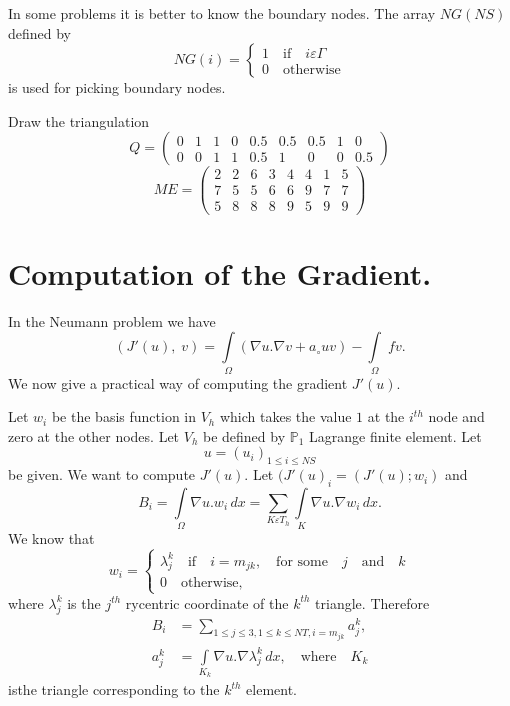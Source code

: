 In some problems it is better to know the boundary nodes. The array
$NG(NS)$ defined by 
\begin{equation*}
NG(i)=
\begin{cases}
1\quad\text{if}\quad i\varepsilon\Gamma\\
0\quad\text{otherwise}
\end{cases}
\end{equation*}
is used for picking boundary nodes.

\begin{exercise}\label{chap4:exr2}
Draw the triangulation
\begin{equation*}
Q=
\begin{pmatrix}
0&1&1&0&0.5&0.5&0.5&1&0\\
0&0&1&1&0.5&1&0&0&0.5
\end{pmatrix}
\end{equation*}
\begin{equation*}
ME=
\begin{pmatrix}
2&2&6&3&4&4&1&5\\
7&5&5&6&6&9&7&7\\
5&8&8&8&9&5&9&9
\end{pmatrix}
\end{equation*}\pageoriginale
\end{exercise}

\section{Computation of the Gradient.}\label{chap4:ssec4.5}
In the Neumann problem we have 
$$
(J'(u),\; v)=\int\limits_\Omega(\nabla u.\nabla v+a_\circ uv)-
\int\limits_\Omega \;fv.
$$
We now give a practical way of computing the gradient $J'(u)$.

Let $w_i$ be the basis function in $V_h$ which takes the value $1$ at
the $i^{th}$ node and zero at the other nodes. Let $V_h$ be defined by
$\mathbb{P}_1$ Lagrange finite element. Let
$$
u=(u_i)_{1\leq i\leq NS}
$$
be given. We want to compute $J'(u)$. Let $(J'(u)_i=(J'(u);w_i)$ and 
$$
B_i=\int\limits_\Omega\nabla u.w_i\,dx= \sum\limits_{K\varepsilon T_h}
\int\limits_K\nabla u.\nabla w_i\,dx.
$$
We know that 
\begin{equation*}
w_i=
\begin{cases}
\lambda_j^k\quad\text{if}\quad i=m_{jk},\quad\text{for some}\quad j
\quad\text{and}\quad k\\
0\quad\text{otherwise},
\end{cases}
\end{equation*}
where $\lambda_j^k$ is the $j^{th}$ rycentric coordinate of the
$k^{th}$ triangle. Therefore
\begin{align*}
B_i &= \sum\limits_{1\leq j\leq 3, 1\leq k\leq NT, i=m_{jk}}a_j^k,\\
a_j^k &= \int\limits_{K_k}\nabla u.\nabla\lambda_j^k\,dx,
\quad\text{where}\quad K_k
\end{align*}
is\pageoriginale the triangle corresponding to the $k^{th}$ element.

